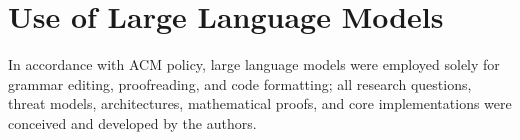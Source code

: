 \documentclass[sigconf,10pt,anonymous]{acmart}
\theoremstyle{remark}
\begin{document}
\section*{Use of Large Language Models}
In accordance with ACM policy, large language models were employed solely for grammar editing, proofreading, and code formatting; all research questions, threat models, architectures, mathematical proofs, and core implementations were conceived and developed by the authors.




\appendix



\end{document}
